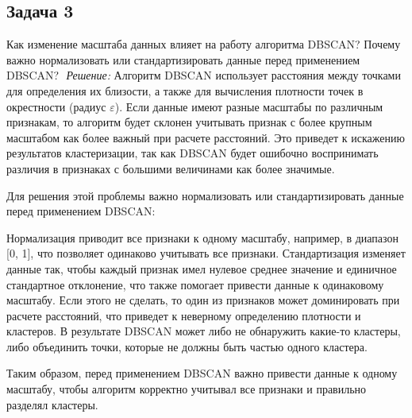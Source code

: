 \subsection*{Задача 3}
Как изменение масштаба данных влияет на работу алгоритма DBSCAN? Почему важно нормализовать или стандартизировать данные перед применением DBSCAN?
\newline $ $ \newline
\textit{Решение:} Алгоритм DBSCAN использует расстояния между точками для определения их близости, а также для вычисления плотности точек в окрестности (радиус $\varepsilon$). Если данные имеют разные масштабы по различным признакам, то алгоритм будет склонен учитывать признак с более крупным масштабом как более важный при расчете расстояний. Это приведет к искажению результатов кластеризации, так как DBSCAN будет ошибочно воспринимать различия в признаках с большими величинами как более значимые.

Для решения этой проблемы важно нормализовать или стандартизировать данные перед применением DBSCAN:

Нормализация приводит все признаки к одному масштабу, например, в диапазон [0, 1], что позволяет одинаково учитывать все признаки.
Стандартизация изменяет данные так, чтобы каждый признак имел нулевое среднее значение и единичное стандартное отклонение, что также помогает привести данные к одинаковому масштабу.
Если этого не сделать, то один из признаков может доминировать при расчете расстояний, что приведет к неверному определению плотности и кластеров. В результате DBSCAN может либо не обнаружить какие-то кластеры, либо объединить точки, которые не должны быть частью одного кластера.

Таким образом, перед применением DBSCAN важно привести данные к одному масштабу, чтобы алгоритм корректно учитывал все признаки и правильно разделял кластеры.
